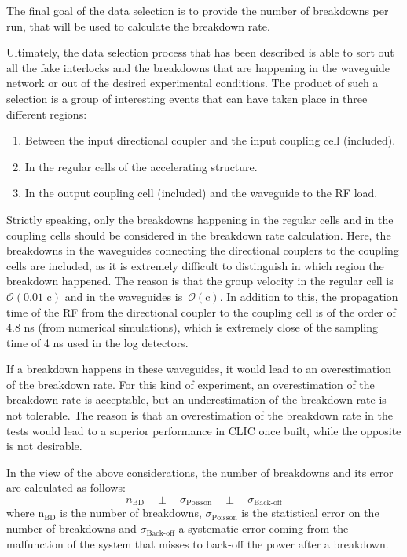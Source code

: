 The final goal of the data selection is to provide the number of breakdowns per run, that will be used to calculate the breakdown rate. 

Ultimately, the data selection process that has been described is able to sort out all the fake interlocks and the breakdowns that are happening in the waveguide network or out of the desired experimental conditions. The product of such a selection is a group of interesting events that can have taken place in three different regions:
\begin{enumerate}
\item Between the input directional coupler and the input coupling cell (included).
\item In the regular cells of the accelerating structure.
\item In the output coupling cell (included) and the waveguide to the RF load.
\end{enumerate}
Strictly speaking, only the breakdowns happening in the regular cells and in the coupling cells should be considered in the breakdown rate calculation. Here, the breakdowns in the waveguides connecting the directional couplers to the coupling cells are included, as it is extremely difficult to distinguish in which region the breakdown happened. The reason is that the group velocity in the regular cell is $\mathcal{O}(\text{0.01 c})$ and in the waveguides is~$\mathcal{O}(\text{c})$. In addition to this, the propagation time of the RF from the directional coupler to the coupling cell is of the order of 4.8 ns (from numerical simulations), which is extremely close of the sampling time of 4 ns used in the log detectors. 

If a breakdown happens in these waveguides, it would lead to an overestimation of the breakdown rate. For this kind of experiment, an overestimation of the breakdown rate is acceptable, but an underestimation of the breakdown rate is not tolerable. The reason is that an overestimation of the breakdown rate in the tests would lead to a superior performance in CLIC once built, while the opposite is not desirable.   

In the view of the above considerations, the number of breakdowns and its error are calculated as follows:
\begin{equation}
n_{\text{BD}} \quad \pm \quad \sigma_{\text{Poisson}} \quad \pm \quad \sigma_{\text{Back-off}} 
\label{numBD}
\end{equation}
where  n$_{\text{BD}}$ is the number of breakdowns, $\sigma_{\text{Poisson}}$ is the statistical error on the number of breakdowns and $\sigma_{\text{Back-off}}$ a systematic error coming from the malfunction of the system that misses to back-off the power after a breakdown.

